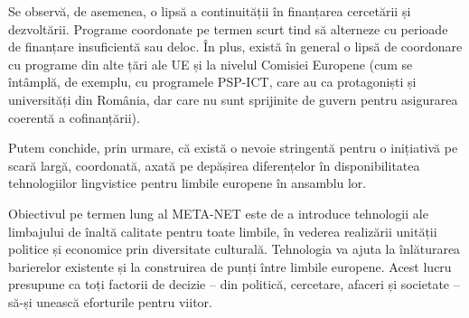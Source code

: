 \begin{multicols}{2}
Se observă, de asemenea, o lipsă a continuității în finanțarea cercetării și dezvoltării. Programe coordonate pe termen scurt tind să alterneze cu perioade de finanțare insuficientă sau deloc. În plus, există în general o lipsă de coordonare cu programe din alte țări ale UE și la nivelul Comisiei Europene (cum se întâmplă, de exemplu, cu programele PSP-ICT, care au ca protagoniști și universități din România, dar care nu sunt sprijinite de guvern pentru asigurarea coerentă a cofinanțării).

Putem conchide, prin urmare, că există o nevoie stringentă pentru o inițiativă pe scară largă, coordonată, axată pe depășirea diferențelor în disponibilitatea tehnologiilor lingvistice pentru limbile europene în ansamblu lor.

Obiectivul pe termen lung al META-NET este de a introduce tehnologii ale limbajului de înaltă calitate pentru toate limbile, în vederea realizării unității politice și economice prin diversitate culturală. Tehnologia va ajuta la înlăturarea barierelor existente și la construirea de punți între limbile europene. Acest lucru presupune ca toți factorii de decizie – din politică, cercetare, afaceri și societate – să-și unească eforturile pentru viitor.

\end{multicols}

\clearpage

